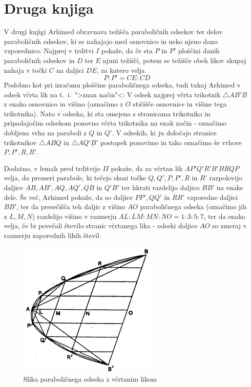 \documentclass[a4paper, 10pt]{article}
\begin{document}
	\section{Druga knjiga}
		V drugi knjigi Arhimed obravnava težišča paraboličnih odsekov ter delov paraboličnih odsekov, ki se nahajajo med osnovnico in neko njeno dano vzporednico.
		Najprej v trditvi $I$ pokaže, da če sta $P$ in $P'$ ploščini danih paraboličnih odsekov in $D$ ter $E$ njuni težišči, potem se težišče obeh likov skupaj nahaja v točki $C$ na daljici $DE$, za katero velja $$P:P' = CE:CD $$
		Podobno kot pri izračunu ploščine paraboličnega odseka, tudi tukaj Arhimed v odsek včrta lik na t.~i.~">znan način"<: V odsek najprej včrta trikotnik $\triangle AB'B$ z enako osnovnico in višino (označimo z $O$ stičišče osnovnice in višine tega trikotnika). Nato v odseka, ki sta omejena s stranicama trikotnika in pripadajočim odsekom ponovno včrta trikotnika na enak način - označimo dobljena vrha na paraboli z $Q$ in $Q'$. V odsekih, ki ju določajo stranice trikotnikov $\triangle ABQ$ in $\triangle AQ'B'$ postopek ponovimo in tako označimo še vrhove $P, P', R, R'$.
		
		Dodatno, v lemah pred trditvijo $II$ pokaže, da za včrtan lik $AP'Q'R'B'BRQP$ velja, da premeri parabole, ki tečejo skozi točke $Q, Q', P, P', R$ in $R'$ razpolovijo daljice $AB, AB', AQ, AQ', QB$ in $Q'B'$ ter hkrati razdelijo daljico $BB'$ na enake dele. Še več, Arhimed pokaže, da so daljice $PP', QQ'$ in $RR'$ vzporedne daljici $BB'$, ter da presečišča teh daljic z višino $AO$ paraboličnega odseka (označimo jih z $L, M, N$) razdelijo višino v razmerju $AL:LM:MN:NO = 1:3:5:7$, ter da enako velja, če bi povečali število stranic včrtanega lika - odseki daljice $AO$ so zmeraj v razmerju zaporednih lihih števil. 
		\begin{figure}[h!]
			\centering
			\includegraphics[scale=0.75]{Parabol.jpg}
			\caption{Slika paraboličnega odseka z včrtanim likom}
		\end{figure}
		
\end{document}
